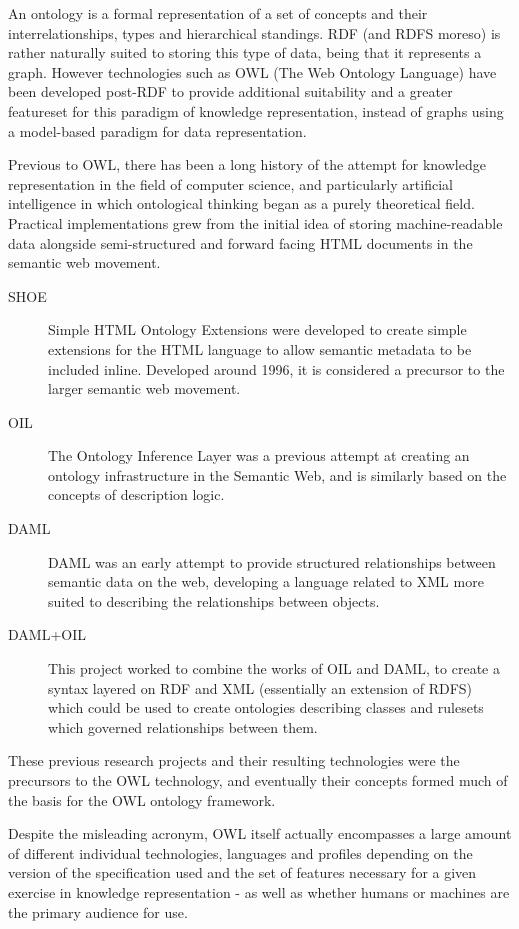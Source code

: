\documentclass{article}
\begin{document}
An ontology\cite{ontology} is a formal representation of a set of concepts and their
interrelationships, types and hierarchical standings. RDF (and RDFS moreso) is
rather naturally suited to storing this type of data, being that it represents 
a graph. However technologies such as OWL (The Web Ontology Language) have been 
developed post-RDF to provide additional suitability and a greater featureset 
for this paradigm of knowledge representation, instead of graphs using a 
model-based paradigm for data representation.

Previous to OWL, there has been a long history of the attempt for knowledge
representation in the field of computer science, and particularly
artificial intelligence in which ontological thinking began as a purely
theoretical field. Practical implementations grew from the initial idea of 
storing machine-readable data alongside semi-structured and forward facing HTML
documents in the semantic web movement. 

\begin{description}
    \item[SHOE] Simple HTML Ontology Extensions were developed to create simple
    extensions for the HTML language to allow semantic metadata to be included
    inline. Developed around 1996, it is considered a precursor to the larger
    semantic web movement.\cite{shoe}
    \item[OIL] The Ontology Inference Layer\cite{oil} was a previous attempt at creating
    an ontology infrastructure in the Semantic Web, and is similarly based on
    the concepts of description logic.
    \item[DAML] DAML\cite{daml} was an early attempt to provide structured relationships
    between semantic data on the web, developing a language related to XML more
    suited to describing the relationships between objects.
    \item[DAML+OIL] This project worked to combine the works of OIL and DAML, to
    create a syntax layered on RDF and XML (essentially an extension of RDFS) which 
    could be used to create ontologies describing classes and rulesets which governed 
    relationships between them.\cite{damloil}
\end{description}

These previous research projects and their resulting technologies were the
precursors to the OWL technology, and eventually their concepts formed much of
the basis for the OWL ontology framework.

Despite the misleading acronym, OWL itself actually encompasses a large amount of
different individual technologies, languages and profiles depending on the version of the 
specification used and the set of features necessary for a given exercise in knowledge
representation - as well as whether humans or machines are the primary audience 
for use. 
\end{document}
